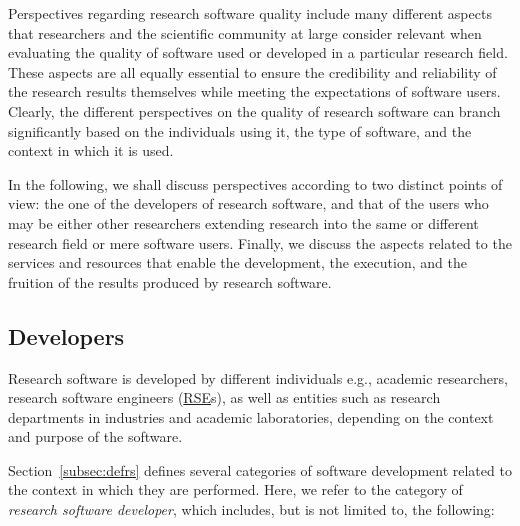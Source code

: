 
Perspectives regarding research software quality include many different aspects that researchers and the scientific community at large consider relevant when evaluating the quality of software used or developed in a particular research field. These aspects are all equally essential to ensure the credibility and reliability of the research results themselves while meeting the expectations of software users. Clearly, the different perspectives on the quality of research software can branch significantly based on the individuals using it, the type of software, and the context in which it is used.

In the following, we shall discuss perspectives according to two distinct points of view: the one of the developers of research software, and that of the users who may be either other researchers extending research into the same or different research field or mere software users. Finally, we discuss the aspects related to the services and resources that enable the development, the execution, and the fruition of the results produced by research software.

\subsection{Developers}

Research software is developed by different individuals e.g., academic researchers, research software engineers (\href{https://society-rse.org/}{RSE}s), as well as entities such as research departments in industries and academic laboratories, depending on the context and purpose of the software.

Section~\ref{subsec:defrs} defines several categories of software development related to the context in which they are performed. Here, we refer to the category of  \textit{research software developer}, which includes, but is not limited to, the following:


